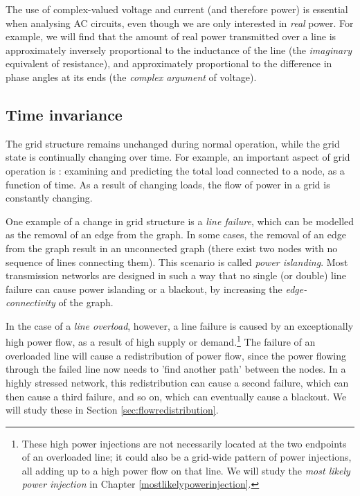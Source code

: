 \documentclass[main.tex]{subfiles}
\begin{document}
The use of complex-valued voltage and current (and therefore power) is essential when analysing AC circuits, even though we are only interested in \emph{real} power. For example, we will find that the amount of real power transmitted over a line is approximately inversely proportional to the inductance of the line (the \emph{imaginary} equivalent of resistance), and approximately proportional to the difference in phase angles at its ends (the \emph{complex argument} of voltage).

\subsection{Time invariance}
The grid structure remains unchanged during normal operation, while the grid state is continually changing over time. For example, an important aspect of grid operation is : examining and predicting the total load connected to a node, as a function of time. As a result of changing loads, the flow of power in a grid is constantly changing.

One example of a change in grid structure is a \emph{line failure}, which can be modelled as the removal of an edge from the graph. In some cases, the removal of an edge from the graph result in an unconnected graph (\ie there exist two nodes with no sequence of lines connecting them). This scenario is called \emph{power islanding}.
Most transmission networks are designed in such a way that no single (or double) line failure can cause power islanding or a blackout, by increasing the \emph{edge-connectivity} of the graph.

In the case of a \emph{line overload}, however, a line failure is caused by an exceptionally high power flow, as a result of high supply or demand.\footnote{These high power injections are not necessarily located at the two endpoints of an overloaded line; it could also be a grid-wide pattern of power injections, all adding up to a high power flow on that line. We will study the \emph{most likely power injection} in Chapter \ref{mostlikelypowerinjection}.}
The failure of an overloaded line will cause a redistribution of power flow, since the power flowing through the failed line now needs to 'find another path' between the nodes. In a highly stressed network, this redistribution can cause a second failure, which can then cause a third failure, and so on, which can eventually cause a blackout. We will study these  in Section \ref{sec:flowredistribution}.
\end{document}
